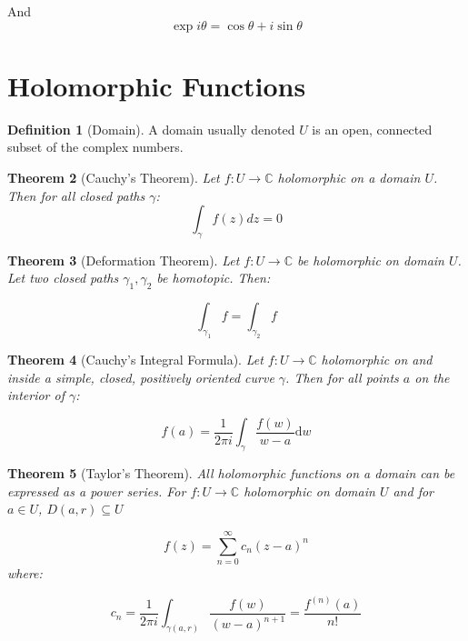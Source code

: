\documentclass[11pt,a4paper, titlepage]{article}
\newtheorem{theorem}{Theorem}[section]
\theoremstyle{definition}
\newtheorem{definition}[theorem]{Definition}
\begin{document}
And
\[
	\exp i \theta = \cos \theta + i \sin \theta
\]
	


\section{Holomorphic Functions}

\begin{definition}[Domain]
A domain usually denoted $U$ is an open, connected subset of the complex numbers.
\end{definition}

\begin{theorem}[Cauchy's Theorem]

Let $ f \colon U \longrightarrow \mathbb{C}$ holomorphic on a domain $U$. Then for all closed paths $\gamma$:
\[
	\int_\gamma f(z) dz = 0
\]

\end{theorem}

\begin{theorem}[Deformation Theorem]

Let $f \colon U \longrightarrow \mathbb{C}$ be holomorphic on domain $U$. Let two closed paths $\gamma_1, \gamma_2 $ be homotopic. Then:

\[
	\int_{\gamma_1} f = \int_{\gamma_2} f
\]	

\end{theorem}

\begin{theorem}[Cauchy's Integral Formula]

Let $f \colon U \longrightarrow \mathbb{C}$ holomorphic on and inside a simple, closed, positively oriented curve $\gamma$. Then for all points $a$ on the interior of $\gamma$:

\[
	f(a) = \frac{1}{2\pi i} \int_\gamma \frac{f(w)}{w-a} \mathrm{d}w
\]	

\end{theorem}

\begin{theorem}[Taylor's Theorem]

All holomorphic functions on a domain can be expressed as a power series. For $f \colon U \longrightarrow \mathbb{C}$ holomorphic on domain $U$ and for $a \in U$, $D(a,r) \subseteq U$

\[
	f(z) = 	\sum_{n=0}^\infty c_n (z-a)^n
\]
where:

\[
	c_n = \frac{1}{2 \pi i} \int_{\gamma(a,r)} \frac{f(w)}{(w-a)^{n+1}} = \frac{f^{(n)}(a)}{n!}
\]
\end{theorem}
\end{document}
